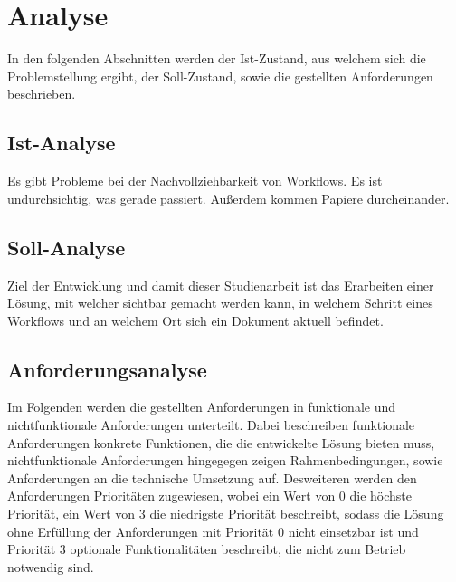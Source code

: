 \chapter{Analyse} \label{chap:analyse}

In den folgenden Abschnitten werden der Ist-Zustand, aus welchem sich die Problemstellung ergibt,
der Soll-Zustand, sowie die gestellten Anforderungen beschrieben.

\section{Ist-Analyse} \label{sec:ist-analyse}

Es gibt Probleme bei der Nachvollziehbarkeit von Workflows. Es ist undurchsichtig, was gerade
passiert. Außerdem kommen Papiere durcheinander.

\section{Soll-Analyse} \label{sec:soll-analyse}

Ziel der Entwicklung und damit dieser Studienarbeit ist das Erarbeiten einer Lösung, mit welcher
sichtbar gemacht werden kann, in welchem Schritt eines Workflows und an welchem Ort sich ein
Dokument aktuell befindet.

\section{Anforderungsanalyse} \label{sec:anforderungsanalyse}

Im Folgenden werden die gestellten Anforderungen in funktionale und nichtfunktionale Anforderungen
unterteilt.
Dabei beschreiben funktionale Anforderungen konkrete Funktionen, die die entwickelte Lösung bieten
muss, nichtfunktionale Anforderungen hingegegen zeigen Rahmenbedingungen, sowie Anforderungen an die
technische Umsetzung auf.
Desweiteren werden den Anforderungen Prioritäten zugewiesen, wobei ein Wert von 0 die höchste
Priorität, ein Wert von 3 die niedrigste Priorität beschreibt, sodass die Lösung ohne Erfüllung der
Anforderungen mit Priorität 0 nicht einsetzbar ist und Priorität 3 optionale Funktionalitäten
beschreibt, die nicht zum Betrieb notwendig sind.

